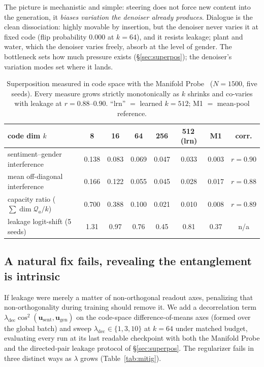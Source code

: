 \documentclass[11pt]{article}
\begin{document}
The picture is
mechanistic and simple: steering does not force new content into the
generation, it \emph{biases variation the denoiser already produces}. Dialogue
is the clean dissociation: highly movable by insertion, but the denoiser never
varies it at fixed code (flip probability $0.000$ at $k{=}64$), and it resists
leakage; plant and water, which the denoiser varies freely, absorb at the level
of gender. The bottleneck sets how much pressure exists
(\S\ref{sec:superpos}); the denoiser's variation modes set where it lands.

\begin{table}[h]\centering\small
\begin{tabular}{l cccccc c}
code dim $k$ & 8 & 16 & 64 & 256 & 512\,(lrn) & M1 & corr. \\
\hline
sentiment--gender interference & 0.138 & 0.083 & 0.069 & 0.047 & 0.033 & 0.003 & $r{=}0.90$ \\
mean off-diagonal interference & 0.166 & 0.122 & 0.055 & 0.045 & 0.028 & 0.017 & $r{=}0.88$ \\
capacity ratio ($\sum\!\dim\mathcal Q_a/k$) & 0.700 & 0.388 & 0.100 & 0.021 & 0.010 & 0.008 & $r{=}0.89$ \\
\hline
leakage logit-shift (5 seeds)  & 1.31 & 0.97 & 0.76 & 0.45 & 0.81 & 0.37 & n/a \\
\end{tabular}
\caption{Superposition measured in code space with the Manifold
Probe~\cite{manifold2026} ($N{=}1500$, five seeds). Every measure grows strictly
monotonically as $k$ shrinks and co-varies with leakage at $r{=}0.88$--$0.90$.
``lrn'' $=$ learned $k{=}512$; M1 $=$ mean-pool reference.}
\label{tab:superpos}
\end{table}

\subsection{A natural fix fails, revealing the entanglement is intrinsic}
\label{sec:mitig}
If leakage were merely a matter of non-orthogonal readout axes, penalizing that
non-orthogonality during training should remove it. We add a decorrelation term
$\lambda_{\mathrm{dec}}\cos^2(\bm u_{\text{sent}},\bm u_{\text{gen}})$ on the
code-space difference-of-means axes (formed over the global batch) and sweep
$\lambda_{\mathrm{dec}}\in\{1,3,10\}$ at $k{=}64$ under matched budget, evaluating
every run at its last readable checkpoint with both the Manifold Probe and the
directed-pair leakage protocol of \S\ref{sec:superpos}. The regularizer fails in
three distinct ways as $\lambda$ grows (Table~\ref{tab:mitig}).
\end{document}
